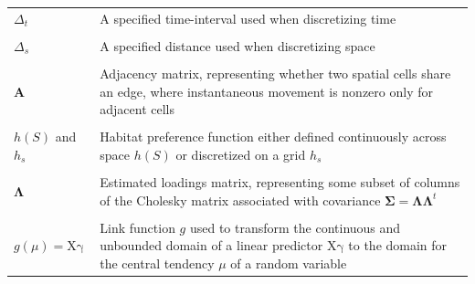 \begin{table}
\begin{center}
\begin{tabularx}{\textwidth}{ | X m{4in} | }
  \( \Delta_t \) & A specified time-interval used when discretizing time \\ & \\

  \( \Delta_s \) & A specified distance used when discretizing space \\ & \\

  \( \mathbf A \) & Adjacency matrix, representing whether two spatial cells share an edge, where instantaneous movement is nonzero only for adjacent cells \\ & \\

  \(h(S)\) and \(h_s\) & Habitat preference function either defined continuously across space \( h(S) \) or discretized on a grid \(h_s\) \\ & \\

  \( \mathbf{\Lambda} \) & Estimated loadings matrix, representing some subset of columns of the Cholesky matrix associated with covariance \( \mathbf{\Sigma = \Lambda \Lambda}^t \) \\ & \\

  \( g(\mu) = \mathrm{X \gamma} \) & Link function \(g\) used to transform the continuous and unbounded domain of a linear predictor \( \mathrm{X \gamma} \) to the domain for the central tendency \(\mu\) of a random variable \\  

  \hline
\end{tabularx}
  \label{tab:Appendix_variables}
\end{center}
\end{table}

